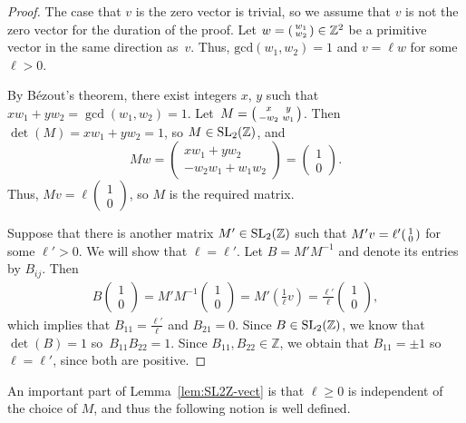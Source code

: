 \documentclass[pdftex]{sigma}
\numberwithin{equation}{section}
\newenvironment{psmallmatrix}
 {\left(\begin{smallmatrix}}
 {\end{smallmatrix}\right)}
\def\Z{{\mathbb Z}}
\newcommand{\SL}{{\rm SL}_2(\Z)}
\newcommand{\vect}[2]{\begin{psmallmatrix} #1 \\ #2 \end{psmallmatrix}}
\begin{document}
\begin{proof}
The case that $v$ is the zero vector is trivial, so we assume that $v$ is not the zero vector for the duration of the proof.
Let $w=\vect{w_1}{w_2}\in\Z^2$ be a primitive vector in the same direction as~$v$.
Thus, $\mathrm{gcd}(w_1,w_2)=1$ and $v = \ell w$ for some $\ell>0$.

By B\'{e}zout's theorem, there exist integers $x$, $y$ such that $xw_1 + yw_2 = \gcd (w_1,w_2) = 1$. Let~$M = \begin{psmallmatrix} x & y \\ -w_2 & w_1 \end{psmallmatrix}$. Then~$\det(M) = xw_1 +yw_2 =1$, so $M \in \SL$, and
\[
Mw =\begin{pmatrix}
xw_1+yw_2 \\ -w_2w_1+w_1w_2 \end{pmatrix} = \begin{pmatrix} 1\\ 0\end{pmatrix}.
\]
Thus, $Mv = \ell \left(\begin{smallmatrix}  1\\ 0\end{smallmatrix} \right)$, so $M$ is the required matrix.

Suppose that there is another matrix $M' \in \SL$ such that $M' v = \ell' \vect{1}{0}$ for some $\ell'>0$. We will show that $\ell = \ell' $. Let $B = M'M^{-1}$ and denote its entries by $B_{ij}$. Then
\begin{align*}\label{eq:sl_h2}
 B \begin{pmatrix} 1\\ 0\end{pmatrix} = M' M^{-1}\begin{pmatrix} 1\\ 0\end{pmatrix} = M' \left( \frac{1}{\ell} v \right) = \frac{\ell'}{\ell} \begin{pmatrix} 1\\ 0\end{pmatrix} ,
\end{align*}
which implies that $B_{11} = \frac{\ell'}{\ell}$ and $B_{21} = 0$. Since $B \in \SL$, we know that $\det(B) = 1$ so~$B_{11} B_{22} = 1$. Since $B_{11}, B_{22}\in \mathbb{Z}$, we obtain that $B_{11} = \pm 1$ so $\ell = \ell'$, since both are positive.
\end{proof}



An important part of Lemma~\ref{lem:SL2Z-vect} is that $\ell\geq 0$ is independent of the choice of $M$, and thus the following notion is well defined.
\end{document}
